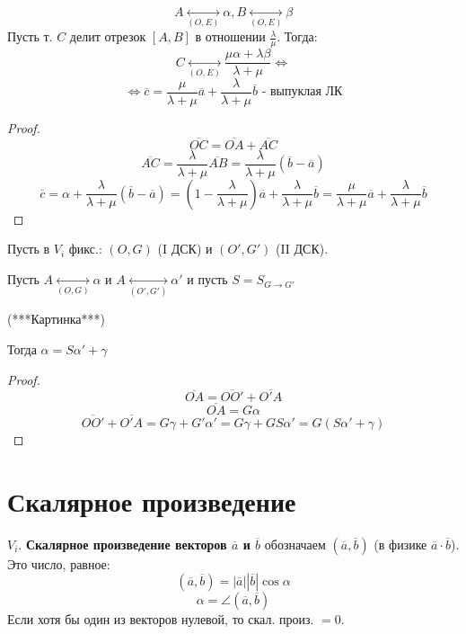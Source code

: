 \begin{statement}
    \[
    A \underset{(O, E)}{\longleftrightarrow}\alpha, B \underset{(O, E)}{\longleftrightarrow} \beta
    \] 
    Пусть т. $C$ делит отрезок $[A, B]$ в отношении $\frac{\lambda}{\mu}$. Тогда:
    \[
        C \underset{(O, E)}{\longleftrightarrow} \frac{\mu\alpha + \lambda \beta}{\lambda + \mu} \iff
    \] 
    \[
        \iff \overline{c} = \frac{\mu}{\lambda + \mu} \overline{a} + \frac{\lambda}{\lambda + \mu} \overline{b} \text{ - выпуклая ЛК}
    \] 

\end{statement}
\begin{proof}
    \[
    \overline{OC} = \overline{OA} + \overline{AC}
    \] 
    \[
    \overline{AC} = \frac{\lambda}{\lambda + \mu} \overline{AB} = \frac{\lambda}{\lambda + \mu}(\overline{b} - \overline{a})
    \] 
    \[
    \overline{c} = \alpha + \frac{\lambda}{\lambda + \mu} (\overline{b} - \overline{a}) = (1 - \frac{\lambda}{\lambda + \mu}) \overline{a} + \frac{\lambda}{\lambda + \mu} \overline{b} = \frac{\mu}{\lambda + \mu} \overline{a} + \frac{\lambda}{\lambda + \mu} \overline{b}
    \] 
\end{proof}
\begin{theorem} 
Пусть в $V_i$ фикс.: $(O, G)$ (I ДСК) и $(O', G')$ (II ДСК).

Пусть $A \underset{(O, G)}{\longleftrightarrow} \alpha$ и $A \underset{(O', G')}{\longleftrightarrow} \alpha'$ и пусть $S = S_{G \to G'}$

(***Картинка***)

Тогда $\alpha = S\alpha' + \gamma$
\end{theorem}
\begin{proof}
\[
\overline{OA} = \overline{OO'} + \overline{O'A}
\] 
\[
\overline{OA} = G \alpha
\] 
\[
\overline{OO'} + \overline{O'A} = G \gamma + G' \alpha' = G \gamma + GS \alpha' = G(S\alpha' + \gamma)
\] 
\end{proof}
\section{Скалярное произведение}

\begin{definition}
$V_i$. \textbf{Скалярное произведение векторов $\overline{a}$ и $\overline{b}$} обозначаем $(\overline{a}, \overline{b})$ (в физике $\overline{a} \cdot \overline{b}$). Это число, равное:
\[
    (\overline{a}, \overline{b}) = |\overline{a}||\overline{b}|\cos \alpha
\] 
\[
\alpha = \angle (\overline{a}, \overline{b})
\] 
Если хотя бы один из векторов нулевой, то скал. произ. $ = 0$.
\end{definition}

